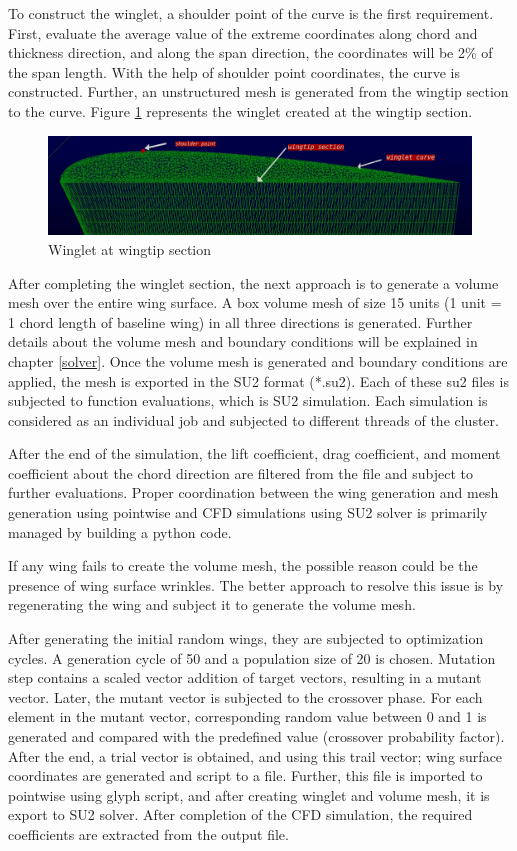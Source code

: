 To construct the winglet, a shoulder point of the curve is the first requirement. First, evaluate the average value of the extreme coordinates along chord and thickness direction, and along the span direction, the coordinates will be 2\% of the span length. With the help of shoulder point coordinates, the curve is constructed. Further, an unstructured mesh is generated from the wingtip section to the curve. Figure \ref{winglet} represents the winglet created at the wingtip section.

\begin{figure}[!htbp]
    \centering
    \includegraphics[scale=0.4]{figures/winglet_1.png}
    \caption{Winglet at wingtip section}
    \label{winglet}
\end{figure}

After completing the winglet section, the next approach is to generate a volume mesh over the entire wing surface. A box volume mesh of size 15 units (1 unit = 1 chord length of baseline wing) in all three directions is generated. Further details about the volume mesh and boundary conditions will be explained in chapter \ref{solver}. Once the volume mesh is generated and boundary conditions are applied, the mesh is exported in the SU2 format (*.su2). Each of these su2 files is subjected to function evaluations, which is SU2 simulation. Each simulation is considered as an individual job and subjected to different threads of the cluster. 

After the end of the simulation, the lift coefficient, drag coefficient, and moment coefficient about the chord direction are filtered from the file and subject to further evaluations. Proper coordination between the wing generation and mesh generation using pointwise and CFD simulations using SU2 solver is primarily managed by building a python code.

If any wing fails to create the volume mesh, the possible reason could be the presence of wing surface wrinkles. The better approach to resolve this issue is by regenerating the wing and subject it to generate the volume mesh. 

After generating the initial random wings, they are subjected to optimization cycles. A generation cycle of 50 and a population size of 20 is chosen. Mutation step contains a scaled vector addition of target vectors, resulting in a mutant vector. Later, the mutant vector is subjected to the crossover phase. For each element in the mutant vector, corresponding random value between 0 and 1 is generated and compared with the predefined value (crossover probability factor). After the end, a trial vector is obtained, and using this trail vector; wing surface coordinates are generated and script to a file. Further, this file is imported to pointwise using glyph script, and after creating winglet and volume mesh, it is export to SU2 solver. After completion of the CFD simulation, the required coefficients are extracted from the output file.

